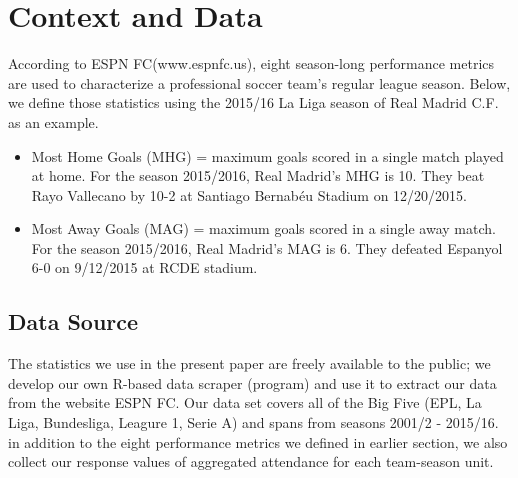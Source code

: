\documentclass[inte,blindrev]{informs3}
\begin{document}
\section*{Context and Data}

According to ESPN FC(www.espnfc.us), eight season-long performance metrics are used to characterize a professional soccer team's regular league season. Below, we define those statistics using the 2015/16 La Liga season of Real Madrid C.F. as an example.
\begin{itemize}
\item Most Home Goals (MHG) = maximum goals scored in a single match played at home. For the season 2015/2016, Real Madrid’s MHG is 10. They beat Rayo Vallecano by 10-2 at Santiago Bernabéu Stadium on 12/20/2015.
\item Most Away Goals (MAG) = maximum goals scored in a single away match. For the season 2015/2016, Real Madrid’s MAG is 6. They defeated Espanyol 6-0 on 9/12/2015 at RCDE stadium.
 
\end{itemize} 
\subsection*{Data Source}
The statistics we use in the present paper are freely available to the public; we develop our own R-based data scraper (program) and use it to extract our data from the website ESPN FC. Our data set covers all of the Big Five (EPL, La Liga, Bundesliga, Leagure 1, Serie A) and spans from seasons 2001/2 - 2015/16. in addition to the eight performance metrics we defined in earlier section, we also collect our response values of aggregated attendance for each team-season unit.   


\end{document}

